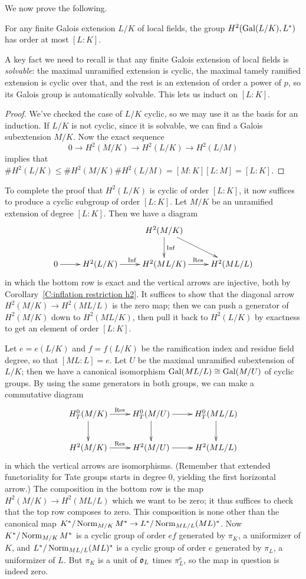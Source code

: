 We now prove the following.
\begin{prop}
For any finite Galois extension $L/K$ of local fields, the group $H^2(\operatorname{Gal}(L/K), L^*)$
has order at most $[L:K]$.
\end{prop}
A key fact we need to recall is that any finite Galois extension of local fields
is \emph{solvable}: the maximal unramified extension is cyclic, the
maximal tamely ramified extension is cyclic over that, and the rest is
an extension of order a power of $p$, so its Galois group is automatically
solvable. This lets us induct on $[L:K]$.
\begin{proof}
We've checked the case of $L/K$ cyclic, so we may use it as the basis for an
induction. If $L/K$ is not cyclic, since it is solvable, we can find a
Galois subextension $M/K$. Now the exact sequence
\[
0 \to H^2(M/K) \to H^2(L/K) \to H^2(L/M)
\]
implies that $\#H^2(L/K) \leq \#H^2(M/K)
\#H^2(L/M) = [M:K][L:M] = [L:K]$.
\end{proof}

To complete the proof that $H^2(L/K)$ is cyclic of order
$[L:K]$, it now suffices to produce a cyclic subgroup of order $[L:K]$.
Let $M/K$ be an unramified extension of degree $[L:K]$. Then we have a diagram
\[
\xymatrix{
& & H^2(M/K) \ar[d]^{\Inf} \ar[rd]
&  \\
0 \ar[r] & H^2(L/K) \ar^{\Inf}[r] & H^2(ML/K) \ar^{\Res}[r]
& H^2(ML/L)
}
\]
in which the bottom row is exact and the vertical arrows are injective,
both by Corollary~\ref{C:inflation restriction h2}. It suffices to show that
the diagonal arrow
$H^2(M/K) \to H^2(ML/L)$ is the zero map; then we can push a generator
of $H^2(M/K)$ down to $H^2(ML/K)$, then pull it back to $H^2(L/K)$ by exactness
to get an element of order $[L:K]$.

Let $e = e(L/K)$ and $f = f(L/K)$ be the ramification index and residue field degree, so that
$[ML:L] = e$. Let $U$ be the maximal unramified subextension of $L/K$;
then we have a canonical isomorphism $\operatorname{Gal}(ML/L) \cong \operatorname{Gal}(M/U)$ of cyclic groups.
By using the same generators in both groups, we can make a commutative diagram
\[
\xymatrix{
H^0_T(M/K) \ar^{\Res}[r] \ar[d] & H^0_T(M/U) \ar[r]  \ar[d]
& H^0_T(ML/L) \ar[d]  \\
H^2(M/K) \ar^{\Res}[r] & H^2(M/U) \ar[r]
 & H^2(ML/L)
}
\]
in which the vertical arrows are isomorphisms. 
(Remember that extended functoriality for Tate groups starts in degree 0, yielding 
the first horizontal arrow.)
The composition in the bottom row is the map $H^2(M/K) \to H^2(ML/L)$ which we want to be zero; it thus suffices to check that the top row composes to zero. This composition is none other than the canonical map
$K^*/\operatorname{Norm}_{M/K} M^* \to L^*/\operatorname{Norm}_{ML/L} (ML)^*$.
Now $K^*/\operatorname{Norm}_{M/K} M^*$ is a cyclic group of order $ef$
generated by $\pi_K$, a uniformizer
of $K$, and $L^*/\operatorname{Norm}_{ML/L} (ML)^*$ is a cyclic group of order
$e$ generated by $\pi_L$, a uniformizer of $L$. But
$\pi_K$ is a unit of $\mathfrak{o}_L$ times $\pi_L^e$, so the map in question is indeed zero.

